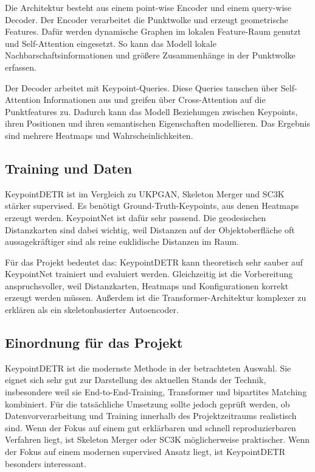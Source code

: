\documentclass[11pt,a4paper]{article}
\begin{document}
Die Architektur besteht aus einem point-wise Encoder und einem query-wise Decoder. Der Encoder verarbeitet die Punktwolke und erzeugt geometrische Features. Dafür werden dynamische Graphen im lokalen Feature-Raum genutzt und Self-Attention eingesetzt. So kann das Modell lokale Nachbarschaftsinformationen und größere Zusammenhänge in der Punktwolke erfassen.

Der Decoder arbeitet mit Keypoint-Queries. Diese Queries tauschen über Self-Attention Informationen aus und greifen über Cross-Attention auf die Punktfeatures zu. Dadurch kann das Modell Beziehungen zwischen Keypoints, ihren Positionen und ihren semantischen Eigenschaften modellieren. Das Ergebnis sind mehrere Heatmaps und Wahrscheinlichkeiten.

\subsection{Training und Daten}

KeypointDETR ist im Vergleich zu UKPGAN, Skeleton Merger und SC3K stärker supervised. Es benötigt Ground-Truth-Keypoints, aus denen Heatmaps erzeugt werden. KeypointNet ist dafür sehr passend. Die geodesischen Distanzkarten sind dabei wichtig, weil Distanzen auf der Objektoberfläche oft aussagekräftiger sind als reine euklidische Distanzen im Raum.

Für das Projekt bedeutet das: KeypointDETR kann theoretisch sehr sauber auf KeypointNet trainiert und evaluiert werden. Gleichzeitig ist die Vorbereitung anspruchsvoller, weil Distanzkarten, Heatmaps und Konfigurationen korrekt erzeugt werden müssen. Außerdem ist die Transformer-Architektur komplexer zu erklären als ein skeletonbasierter Autoencoder.

\subsection{Einordnung für das Projekt}

KeypointDETR ist die modernste Methode in der betrachteten Auswahl. Sie eignet sich sehr gut zur Darstellung des aktuellen Stands der Technik, insbesondere weil sie End-to-End-Training, Transformer und bipartites Matching kombiniert. Für die tatsächliche Umsetzung sollte jedoch geprüft werden, ob Datenvorverarbeitung und Training innerhalb des Projektzeitraums realistisch sind. Wenn der Fokus auf einem gut erklärbaren und schnell reproduzierbaren Verfahren liegt, ist Skeleton Merger oder SC3K möglicherweise praktischer. Wenn der Fokus auf einem modernen supervised Ansatz liegt, ist KeypointDETR besonders interessant.
\end{document}
